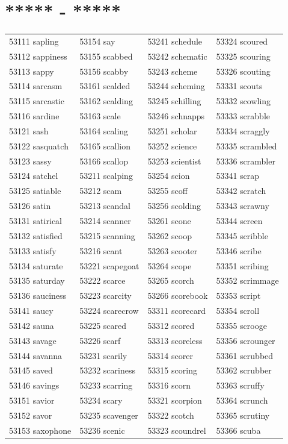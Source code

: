 \documentclass[10pt, oneside]{book}
\begin{document}
\begin{table}[h]
	\centering
	\section*{***** - *****}
	\begin{tabular}{l l l l}
53111 sapling &53154 say &53241 schedule &53324 scoured\\
53112 sappiness &53155 scabbed &53242 schematic &53325 scouring\\
53113 sappy &53156 scabby &53243 scheme &53326 scouting\\
53114 sarcasm &53161 scalded &53244 scheming &53331 scouts\\
53115 sarcastic &53162 scalding &53245 schilling &53332 scowling\\
53116 sardine &53163 scale &53246 schnapps &53333 scrabble\\
53121 sash &53164 scaling &53251 scholar &53334 scraggly\\
53122 sasquatch &53165 scallion &53252 science &53335 scrambled\\
53123 sassy &53166 scallop &53253 scientist &53336 scrambler\\
53124 satchel &53211 scalping &53254 scion &53341 scrap\\
53125 satiable &53212 scam &53255 scoff &53342 scratch\\
53126 satin &53213 scandal &53256 scolding &53343 scrawny\\
53131 satirical &53214 scanner &53261 scone &53344 screen\\
53132 satisfied &53215 scanning &53262 scoop &53345 scribble\\
53133 satisfy &53216 scant &53263 scooter &53346 scribe\\
53134 saturate &53221 scapegoat &53264 scope &53351 scribing\\
53135 saturday &53222 scarce &53265 scorch &53352 scrimmage\\
53136 sauciness &53223 scarcity &53266 scorebook &53353 script\\
53141 saucy &53224 scarecrow &53311 scorecard &53354 scroll\\
53142 sauna &53225 scared &53312 scored &53355 scrooge\\
53143 savage &53226 scarf &53313 scoreless &53356 scrounger\\
53144 savanna &53231 scarily &53314 scorer &53361 scrubbed\\
53145 saved &53232 scariness &53315 scoring &53362 scrubber\\
53146 savings &53233 scarring &53316 scorn &53363 scruffy\\
53151 savior &53234 scary &53321 scorpion &53364 scrunch\\
53152 savor &53235 scavenger &53322 scotch &53365 scrutiny\\
53153 saxophone &53236 scenic &53323 scoundrel &53366 scuba\\
	\end{tabular}
 \end{table}
\end{document}
